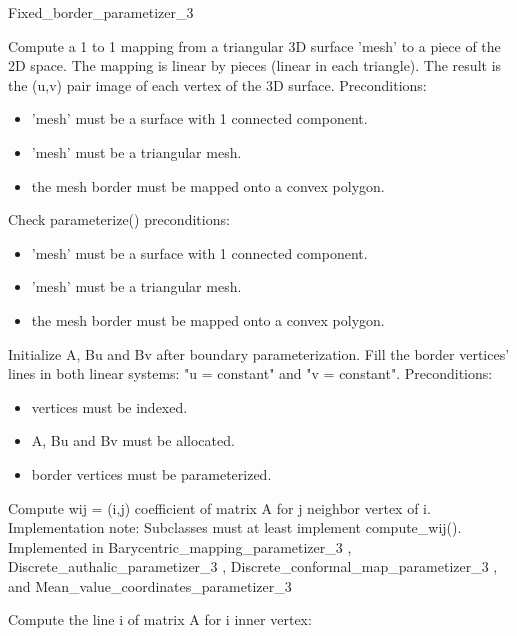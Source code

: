 \begin{ccRefClass}{Fixed_border_parametizer_3}
{
Compute a 1 to 1 mapping from a triangular 3D surface 'mesh' to a piece of the 2D space. The mapping is linear by pieces (linear in each triangle). The result is the (u,v) pair image of each vertex of the 3D surface.
Preconditions:\begin{itemize}
\item 'mesh' must be a surface with 1 connected component.\item 'mesh' must be a triangular mesh.\item the mesh border must be mapped onto a convex polygon. \end{itemize}
}
{
Check parameterize() preconditions:\begin{itemize}
\item 'mesh' must be a surface with 1 connected component.\item 'mesh' must be a triangular mesh.\item the mesh border must be mapped onto a convex polygon. \end{itemize}
}
{
Initialize A, Bu and Bv after boundary parameterization. Fill the border vertices' lines in both linear systems: "u = constant" and "v = constant".
Preconditions:\begin{itemize}
\item vertices must be indexed.\item A, Bu and Bv must be allocated.\item border vertices must be parameterized. \end{itemize}
}
{
Compute wij = (i,j) coefficient of matrix A for j neighbor vertex of i. Implementation note: Subclasses must at least implement compute\_wij().
Implemented in Barycentric\_mapping\_parametizer\_3 , Discrete\_authalic\_parametizer\_3 , Discrete\_conformal\_map\_parametizer\_3 , and Mean\_value\_coordinates\_parametizer\_3
}
{
Compute the line i of matrix A for i inner vertex:\begin{itemize}

\end{itemize}}
\end{ccRefClass}
